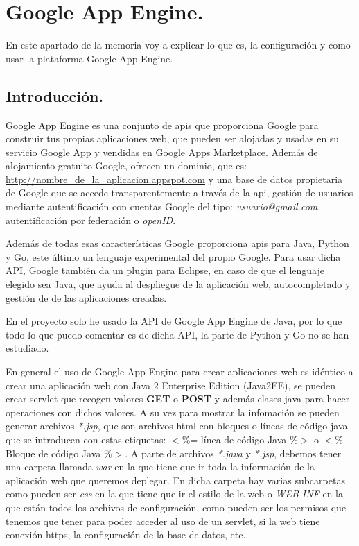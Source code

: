 \chapter{Google App Engine.}\label{cap:GAE}
En este apartado de la memoria voy a explicar lo que es, la configuración y como usar la plataforma Google App Engine.

\section{Introducción.}
Google App Engine es una conjunto de apis que proporciona Google para construir tus propias aplicaciones web, que pueden ser alojadas y usadas en su servicio Google App y vendidas en Google Apps Marketplace. Además de alojamiento gratuito Google, ofrecen un dominio, que es: \url{http://nombre\_de\_la\_aplicacion.appspot.com} y una base de datos propietaria de Google que se accede transparentemente a través de la api, gestión de usuarios mediante autentificación con cuentas Google del tipo: \textit{usuario@gmail.com}, autentificación por federación o \textit{openID}.

Además de todas esas características Google proporciona apis para Java, Python y Go, este último un lenguaje experimental del propio Google. Para usar dicha API, Google también da un plugin para Eclipse, en caso de que el lenguaje elegido sea Java, que ayuda al despliegue de la aplicación web, autocompletado y gestión de de las aplicaciones creadas. 

En el proyecto solo he usado la API de Google App Engine de Java, por lo que todo lo que puedo comentar es de dicha API, la parte de Python y Go no se han estudiado.

En general el uso de Google App Engine para crear aplicaciones web es idéntico a crear una aplicación web con Java 2 Enterprise Edition (Java2EE), se pueden crear servlet que recogen valores \textbf{GET} o \textbf{POST} y además clases java para hacer operaciones con dichos valores. A su vez para mostrar la infomación se pueden generar archivos \textit{*.jsp}, que son archivos html con bloques o líneas de código java que se introducen con estas etiquetas: $<$\%= línea de código Java \%$>$ o $<$\% Bloque de código Java \%$>$. A parte de archivos \textit{*.java} y \textit{*.jsp}, debemos tener una carpeta llamada \textit{war} en la que tiene que ir toda la información de la aplicación web que queremos deplegar. En dicha carpeta hay varias subcarpetas como pueden ser \textit{css} en la que tiene que ir el estilo de la web o \textit{WEB-INF} en la que están todos los archivos de configuración, como pueden ser los permisos que tenemos que tener para poder acceder al uso de un servlet, si la web tiene conexión https, la configuración de la base de datos, etc.

